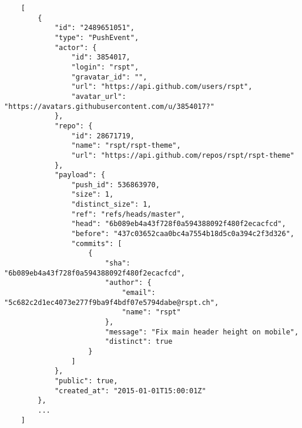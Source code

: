 \begin{verbatim}
    [
        {
            "id": "2489651051",
            "type": "PushEvent",
            "actor": {
                "id": 3854017,
                "login": "rspt",
                "gravatar_id": "",
                "url": "https://api.github.com/users/rspt",
                "avatar_url": "https://avatars.githubusercontent.com/u/3854017?"
            },
            "repo": {
                "id": 28671719,
                "name": "rspt/rspt-theme",
                "url": "https://api.github.com/repos/rspt/rspt-theme"
            },
            "payload": {
                "push_id": 536863970,
                "size": 1,
                "distinct_size": 1,
                "ref": "refs/heads/master",
                "head": "6b089eb4a43f728f0a594388092f480f2ecacfcd",
                "before": "437c03652caa0bc4a7554b18d5c0a394c2f3d326",
                "commits": [
                    {
                        "sha": "6b089eb4a43f728f0a594388092f480f2ecacfcd",
                        "author": {
                            "email": "5c682c2d1ec4073e277f9ba9f4bdf07e5794dabe@rspt.ch",
                            "name": "rspt"
                        },
                        "message": "Fix main header height on mobile",
                        "distinct": true
                    }
                ]
            },
            "public": true,
            "created_at": "2015-01-01T15:00:01Z"
        },
        ...
    ]
\end{verbatim}

